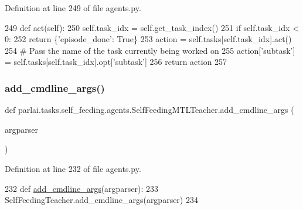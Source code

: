 Definition at line 249 of file agents.\+py.


\begin{DoxyCode}
249     \textcolor{keyword}{def }act(self):
250         self.task\_idx = self.get\_task\_index()
251         \textcolor{keywordflow}{if} self.task\_idx < 0:
252             \textcolor{keywordflow}{return} \{\textcolor{stringliteral}{'episode\_done'}: \textcolor{keyword}{True}\}
253         action = self.tasks[self.task\_idx].act()
254         \textcolor{comment}{# Pass the name of the task currently being worked on}
255         action[\textcolor{stringliteral}{'subtask'}] = self.tasks[self.task\_idx].opt[\textcolor{stringliteral}{'subtask'}]
256         \textcolor{keywordflow}{return} action
257 
\end{DoxyCode}
\mbox{\label{classparlai_1_1tasks_1_1self__feeding_1_1agents_1_1SelfFeedingMTLTeacher_a7e8b6a7c6d8d05a46e0ed6da2b0988cb}} 
\subsubsection{\texorpdfstring{add\+\_\+cmdline\+\_\+args()}{add\_cmdline\_args()}}
{\footnotesize\ttfamily def parlai.\+tasks.\+self\+\_\+feeding.\+agents.\+Self\+Feeding\+M\+T\+L\+Teacher.\+add\+\_\+cmdline\+\_\+args (\begin{DoxyParamCaption}\item[{}]{argparser }\end{DoxyParamCaption})\hspace{0.3cm}{\ttfamily [static]}}



Definition at line 232 of file agents.\+py.


\begin{DoxyCode}
232     \textcolor{keyword}{def }\hyperlink{namespaceparlai_1_1agents_1_1drqa_1_1config_a62fdd5554f1da6be0cba185271058320}{add\_cmdline\_args}(argparser):
233         SelfFeedingTeacher.add\_cmdline\_args(argparser)
234 
\end{DoxyCode}
\mbox{\label{classparlai_1_1tasks_1_1self__feeding_1_1agents_1_1SelfFeedingMTLTeacher_ab27a186b935f2194fb38e56bfe14b86c}} 
